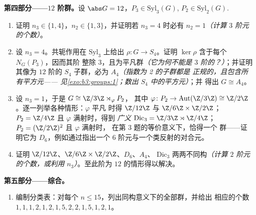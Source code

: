 \begin{problem}
\medskip
\noindent\textbf{第四部分——$12$ 阶群。}设 $\abs G = 12$，$P_3
\in \mathrm{Syl}_3(G)$, $P_2 \in \mathrm{Syl}_2(G)$.
\begin{enumerate}[resume]
  \item 证明 $n_3 \in \{1, 4\}$，$n_2 \in \{1, 3\}$，并证明若 $n_3
        = 4$ 时必有 $n_2 = 1$\emph{（计算
        $3$ 阶元的个数）}。
  \item 设 $n_3 = 4$。共轭作用在
        $\mathrm{Syl}_3$ 上给出 $\rho \colon G \to S_4$。证明
        $\ker \rho$ 含于每个 $N_G(P_3)$，因而其阶
        整除 $3$，且为平凡群\emph{（它为何不能是
        $3$ 阶的？）}；并证明其像为 $12$ 阶的
        $S_4$ 子群，必为 $A_4$\emph{（指数为 2 的子群都是
        正规的，且包含所有平方元——
        见\cref{exo:b3:groups:1}；数出 $S_4$ 中的平方元）}；并
        得出 $G \cong A_4$。
  \item 设 $n_3 = 1$，于是 $G \cong \Z/3\Z \rtimes_\varphi P_2$，
        其中 $\varphi \colon P_2 \to \operatorname{Aut}(\Z/3\Z)
        \cong \Z/2\Z$。逐一列举各种情形：$\varphi$ 平凡
        时得 $\Z/12\Z$ 与 $\Z/6\Z \times \Z/2\Z$；$P_2 =
        \Z/4\Z$ 且 $\varphi$ 满射时，得到
        \emph{广义} $\mathrm{Dic}_3 = \Z/3\Z \rtimes
        \Z/4\Z$；$P_2 = (\Z/2\Z)^2$ 且 $\varphi$ 满射时，
        在第 3 题的等价意义下，恰得一个
        群——证明它为 $D_6$，例如通过指出一个
        $6$ 阶元与一个类反射的对合元。
  \item 证明 $\Z/12\Z$、$\Z/6\Z \times \Z/2\Z$、$D_6$、$A_4$、
        $\mathrm{Dic}_3$ 两两不同构\emph{（计算
        $2$ 阶元的个数，或利用 $n_3$）}。至此阶为
        $12$ 的情形得以解决。
\end{enumerate}

\medskip
\noindent\textbf{第五部分——综合。}
\begin{enumerate}[resume]
  \item 编制分类表：对每个 $n \leq
        15$，列出同构意义下的全部群，并给出
        相应的个数 $1, 1, 1, 2, 1, 2, 1, 5, 2, 2, 1, 5, 1, 2, 1$。
\end{enumerate}


\end{problem}
